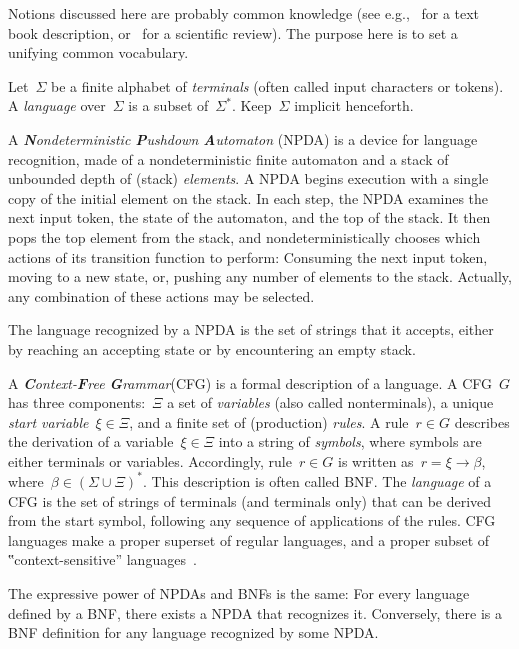 Notions discussed here are probably common knowledge
 (see e.g.,~\cite{Hopcroft:Ullman:01,Linz:2001} for a text book description,
 or~\cite{Autebert:97} for a scientific review).
The purpose here is to set a unifying common vocabulary.

Let~$Σ$ be a finite alphabet of \emph{terminals} (often called input characters or tokens).
A \emph{language} over~$Σ$
  is a subset of~$Σ^*$.
Keep~$Σ$ implicit henceforth.

A \emph{\textbf Nondeterministic \textbf Pushdown \textbf Automaton} (NPDA) is a device for language recognition,
  made of a nondeterministic finite automaton
  and a stack of unbounded depth of (stack) \emph{elements}.
A NPDA begins execution with a single copy of the initial element on the stack.
In each step, the NPDA
  examines the next input token,
  the state of the automaton,
  and the top of the stack.
It then pops the top element from the stack, and nondeterministically chooses which actions of
  its transition function to perform:
  Consuming the next input token,
  moving to a new state,
  or, pushing any number of elements to the stack.
Actually, any combination of these actions may be selected.

The language recognized by a NPDA is the set of strings that it accepts,
  either by reaching an accepting state or by encountering an empty stack.

A \emph{\textbf Context-\textbf Free \textbf Grammar}(CFG) is a formal description of a language.
A CFG~$G$ has three components:~$Ξ$ a set of \emph{variables} (also called nonterminals),
  a unique \emph{start variable}~$ξ∈Ξ$, and a finite set of (production) \emph{rules}.
A rule~$r∈G$ describes the derivation of a variable~$ξ∈Ξ$ into
  a string of \emph{symbols}, where symbols are either terminals or variables.
Accordingly, rule~$r∈G$ is written as~$r=ξ→β$, where~$β∈\left(Σ∪Ξ\right)^*$.
This description is often called BNF\@.
The \emph{language} of a CFG is the set of strings of terminals (and terminals only)
  that can be derived from the start symbol, following any sequence of applications of the rules.
CFG languages make a proper superset of regular languages, and a proper subset of 
  ‟context-sensitive” languages~\cite{Hopcroft:Ullman:01}.

The expressive power of NPDAs and BNFs is the same:
  For every language defined by a BNF, there exists a NPDA that recognizes it.
Conversely, there is a BNF definition for any language recognized by some NPDA.

